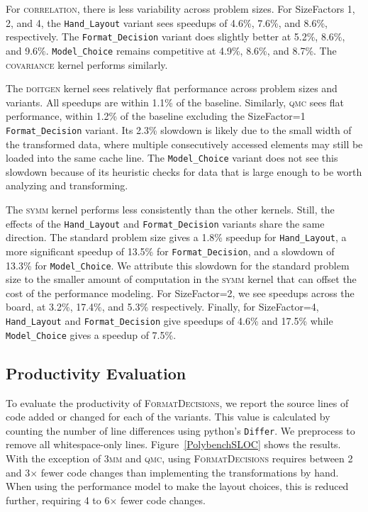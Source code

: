 \documentclass[sigconf,review=true]{acmart}
\newcommand{\FormatDecisions}[0]{{\textsc{FormatDecisions}}}
\begin{document}
For \textsc{correlation}, there is less variability across problem sizes. 
For SizeFactors 1, 2, and 4, the \verb.Hand_Layout. variant sees speedups of 4.6\%, 7.6\%, and 8.6\%, respectively. 
The \verb.Format_Decision. variant does slightly better at 5.2\%, 8.6\%, and 9.6\%.
\verb.Model_Choice. remains competitive at 4.9\%, 8.6\%, and 8.7\%.
The \textsc{covariance} kernel performs similarly.

The \textsc{doitgen} kernel sees relatively flat performance across problem sizes and variants. All speedups are within 1.1\% of the baseline.
Similarly, \textsc{qmc} sees flat performance, within 1.2\% of the baseline excluding the SizeFactor=1 \verb.Format_Decision. variant. 
Its 2.3\% slowdown is likely due to the small width of the transformed data, where multiple consecutively accessed elements may still be loaded into the same cache line. 
The \verb.Model_Choice. variant does not see this slowdown because of its heuristic checks for data that is large enough to be worth analyzing and transforming. 



The \textsc{symm} kernel performs less consistently than the other kernels.
Still, the effects of the \verb.Hand_Layout. and \verb.Format_Decision. variants share the same direction.
The standard problem size gives a 1.8\% speedup for \verb.Hand_Layout., a more significant speedup of 13.5\% for \verb.Format_Decision., and a slowdown of 13.3\% for \verb.Model_Choice.. 
We attribute this slowdown for the standard problem size to the smaller amount of computation in the \textsc{symm} kernel that can offset the cost of the performance modeling. 
For SizeFactor=2, we see speedups across the board, at 3.2\%, 17.4\%, and 5.3\% respectively.
Finally, for SizeFactor=4, \verb.Hand_Layout. and \verb.Format_Decision. give speedups of 4.6\% and 17.5\% while \verb.Model_Choice. gives a speedup of 7.5\%.


\subsection{Productivity Evaluation}

To evaluate the productivity of \FormatDecisions{}, we report the source lines of code added or changed for each of the variants.
This value is calculated by counting the number of line differences using python's \verb.Differ.. 
We preprocess to remove all whitespace-only lines.
Figure~\ref{PolybenchSLOC} shows the results.
With the exception of \textsc{3mm} and \textsc{qmc}, using \FormatDecisions{} requires between 2 and 3$\times$ fewer code changes than implementing the transformations by hand. 
When using the performance model to make the layout choices, this is reduced further, requiring 4 to 6$\times$ fewer code changes. 
\end{document}

